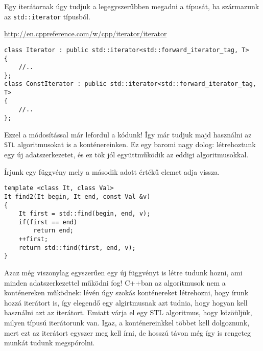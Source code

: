 \documentclass[a4paper,11.5pt]{article}
\begin{document}
	Egy iterátornak úgy tudjuk a legegyszerűbben megadni a típusát, ha származunk az \texttt{std::iterator} típusból.
	
	\url{http://en.cppreference.com/w/cpp/iterator/iterator}
	
	\begin{lstlisting}
class Iterator : public std::iterator<std::forward_iterator_tag, T>
{
	//..
};
class ConstIterator : public std::iterator<std::forward_iterator_tag, T>
{
	//..
};
	\end{lstlisting}
	Ezzel a módosítással már lefordul a kódunk! Így már tudjuk majd használni az \texttt{STL} algoritmusokat is a konténereinken. Ez egy baromi nagy dolog: létrehoztunk egy új adatszerkezetet, és ez tök jól együttműködik az eddigi algoritmusokkal.
	
	\medskip
	Írjunk egy függvény mely a második adott értékű elemet adja vissza.
	\begin{lstlisting}
template <class It, class Val>
It find2(It begin, It end, const Val &v)
{
	It first = std::find(begin, end, v);
	if(first == end)
		return end;
	++first;
	return std::find(first, end, v);
}
	\end{lstlisting}
	Azaz még viszonylag egyszerűen egy új függvényt is létre tudunk hozni, ami minden adatszerkezettel működni fog! C++ban az algoritmusok nem a konténereken működnek: lévén úgy szokás konténereket létrehozni, hogy írunk hozzá iterátort is, így elegendő egy algirtmusnak azt tudnia, hogy hogyan kell használni azt az iterátort. Emiatt várja el egy STL algoritmus, hogy közöüljük, milyen típusú iterátorunk van. Igaz, a konténereinkkel többet kell dolgoznunk, mert ezt az iterátort egyszer meg kell írni, de hosszú távon még így is rengeteg munkát tudunk megspórolni.
\end{document}
